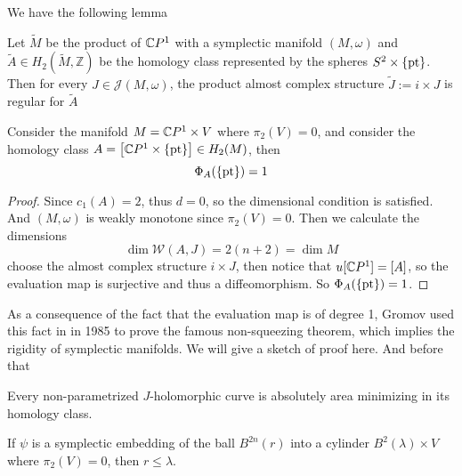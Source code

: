 \documentclass[twoside]{article}
\begin{document}
We have the following lemma

\begin{lemma}
    Let $\widetilde{M}$ be the product of $\mathbb{C}P^{1}$ with a symplectic manifold 
    $(M,\omega)$ and $\widetilde{A}\in H_2(\widetilde{M},\mathbb{Z})$ 
    be the homology class represented by the spheres $S^2\times\{\operatorname{pt}\}  $. 
    Then for every $J\in\mathscr{J}(M,\omega)$, 
    the product almost complex structure $\widetilde{J}:=i\times J$ is regular for $\widetilde{A}$
\end{lemma}

\begin{example}
    Consider the manifold $M=\mathbb{C}P^{1}\times V$ where $\pi_2(V)=0$, 
    and consider the homology class $A=\left[\mathbb{C}P^{1}\times \{\operatorname{pt}\}\right]\in H_2(M)$, then
    \[\Phi_{A}(\{\operatorname{pt}\})=1\]
\end{example}

\begin{proof}
    Since $c_1(A)=2$, thus $d=0$, so the dimensional condition is satisfied.  
    And $(M,\omega)$ is weakly monotone since $\pi_2(V)=0$. 
    Then we calculate the dimensions
    \[\dim\mathscr{W}(A,J)=2(n+2)=\dim M\]
    choose the almost complex structure $i\times J$, then notice that $u[\mathbb{C}P^{1}]=[A]$, 
    so the evaluation map is surjective and thus a diffeomorphism. So $\Phi_{A}(\{\operatorname{pt}\})=1$.
\end{proof} 

As a consequence of the fact that the evaluation map is of degree 1, 
Gromov used this fact in \cite{gromov} in 1985 to prove the famous non-squeezing theorem, 
which implies the rigidity of symplectic manifolds. We will give a sketch of proof here. 
And before that

\begin{lemma}
    Every non-parametrized $J$-holomorphic curve is absolutely area minimizing in its homology class.
\end{lemma}

\begin{theorem}
    If $\psi$ is a symplectic embedding of the ball $B^{2n}(r)$ into a cylinder $B^2(\lambda)\times V$ where $\pi_2(V)=0$, then $r\leq \lambda$.
\end{theorem}
\end{document}
